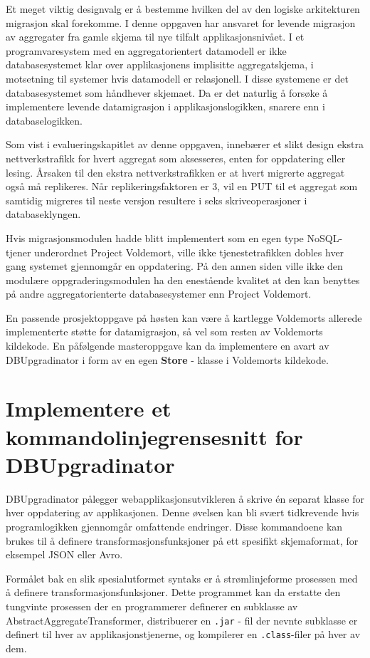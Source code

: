 Et meget viktig designvalg er å bestemme hvilken del av den logiske arkitekturen migrasjon skal forekomme. I denne oppgaven har ansvaret for levende migrasjon av aggregater fra gamle skjema til nye tilfalt applikasjonsnivået. I et programvaresystem med en aggregatorientert datamodell er ikke databasesystemet klar over applikasjonens implisitte aggregatskjema, i motsetning til systemer hvis datamodell er relasjonell. I disse systemene er det databasesystemet som håndhever skjemaet. Da er det naturlig å forsøke å implementere levende datamigrasjon i applikasjonslogikken, snarere enn i databaselogikken.

Som vist i evalueringskapitlet av denne oppgaven, innebærer et slikt design ekstra nettverkstrafikk for hvert aggregat som aksesseres, enten for oppdatering eller lesing. Årsaken til den ekstra nettverkstrafikken er at hvert migrerte aggregat også må replikeres. Når replikeringsfaktoren er 3, vil en PUT til et aggregat som samtidig migreres til neste versjon resultere i seks skriveoperasjoner i databaseklyngen.

Hvis migrasjonsmodulen hadde blitt implementert som en egen type NoSQL-tjener underordnet Project Voldemort, ville ikke tjenestetrafikken dobles hver gang systemet gjennomgår en oppdatering. På den annen siden ville ikke den modulære oppgraderingsmodulen ha den enestående kvalitet at den kan benyttes på andre aggregatorienterte databasesystemer enn Project Voldemort.

En passende prosjektoppgave på høsten kan være å kartlegge Voldemorts allerede implementerte støtte for datamigrasjon, så vel som resten av Voldemorts kildekode. En påfølgende masteroppgave kan da implementere en avart av DBUpgradinator i form av en egen \textbf{Store} - klasse i Voldemorts kildekode.

\section{Implementere et kommandolinjegrensesnitt for DBUpgradinator}

DBUpgradinator pålegger webapplikasjonsutvikleren å skrive én separat klasse for hver oppdatering av applikasjonen. Denne øvelsen kan bli svært tidkrevende hvis programlogikken gjennomgår omfattende endringer. Disse kommandoene kan brukes til å definere transformasjonsfunksjoner på ett spesifikt skjemaformat, for eksempel JSON eller Avro.

Formålet bak en slik spesialutformet syntaks er å strømlinjeforme prosessen med å definere transformasjonsfunksjoner. Dette programmet kan da erstatte den tungvinte prosessen der en programmerer definerer en subklasse av AbstractAggregateTransformer, distribuerer en \texttt{.jar} - fil der nevnte subklasse er definert til hver av applikasjonstjenerne, og kompilerer en \texttt{.class}-filer på hver av dem. 

